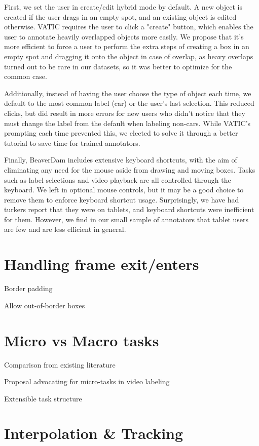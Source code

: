 First, we set the user in create/edit hybrid mode by default.
A new object is created if the user drags in an empty spot, and an existing object is edited otherwise.
VATIC requires the user to click a "create" button, which enables the user to annotate heavily overlapped objects more easily.
We propose that it's more efficient to force a user to perform the extra steps of creating a box in an empty spot and dragging it onto the object in case of overlap,
as heavy overlaps turned out to be rare in our datasets, so it was better to optimize for the common case.

Additionally, instead of having the user choose the type of object each time, we default to the most common label (car) or the user's last selection.
This reduced clicks, but did result in more errors for new users who didn't notice that they must change the label from the default when labeling non-cars.
While VATIC's prompting each time prevented this, we elected to solve it through a better tutorial to save time for trained annotators.

Finally, BeaverDam includes extensive keyboard shortcuts, with the aim of eliminating any need for the mouse aside from drawing and moving boxes. 
Tasks such as label selections and video playback are all controlled through the keyboard.
We left in optional mouse controls, but it may be a good choice to remove them to enforce keyboard shortcut usage.
Surprisingly, we have had turkers report that they were on tablets, and keyboard shortcuts were inefficient for them.
However, we find in our small sample of annotators that tablet users are few and are less efficient in general.

\section{Handling frame exit/enters}

Border padding

Allow out-of-border boxes

\section{Micro vs Macro tasks}

Comparison from existing literature

Proposal advocating for micro-tasks in video labeling

Extensible task structure

\section{Interpolation \& Tracking}
